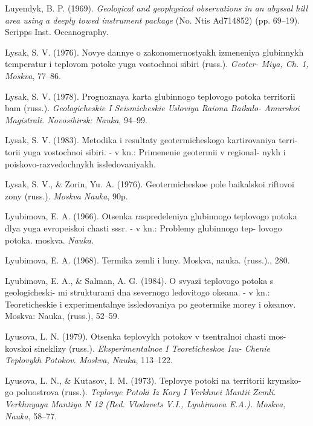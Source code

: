 \documentclass[draft,linenumbers]{agujournal2018}
\begin{document}
\leavevmode{}%
Luyendyk, B. P. (1969). \emph{Geological and geophysical observations in
an abyssal hill area using a deeply towed instrument package} (No. Ntis
Ad714852) (pp. 69--19). Scripps Inst. Oceanography.

\leavevmode{}%
Lysak, S. V. (1976). Novye dannye o zakonomernostyakh izmeneniya
glubinnykh temperatur i teplovom potoke yuga vostochnoi sibiri (russ.).
\emph{Geoter- Miya, Ch. 1, Moskva}, 77--86.

\leavevmode{}%
Lysak, S. V. (1978). Prognoznaya karta glubinnogo teplovogo potoka
territorii bam (russ.). \emph{Geologicheskie I Seismicheskie Usloviya
Raiona Baikalo- Amurskoi Magistrali. Novosibirsk: Nauka}, 94--99.

\leavevmode{}%
Lysak, S. V. (1983). Metodika i resultaty geotermicheskogo kartirovaniya
terri- torii yuga vostochnoi sibiri. - v kn.: Primenenie geotermii v
regional- nykh i poiskovo-razvedochnykh issledovaniyakh.

\leavevmode{}%
Lysak, S. V., \& Zorin, Yu. A. (1976). Geotermicheskoe pole baikalskoi
riftovoi zony (russ.). \emph{Moskva Nauka}, 90p.

\leavevmode{}%
Lyubimova, E. A. (1966). Otsenka raspredeleniya glubinnogo teplovogo
potoka dlya yuga evropeiskoi chasti sssr. - v kn.: Problemy glubinnogo
tep- lovogo potoka. moskva. \emph{Nauka.}

\leavevmode{}%
Lyubimova, E. A. (1968). Termika zemli i luny. Moskva, nauka. (russ.).,
280.

\leavevmode{}%
Lyubimova, E. A., \& Salman, A. G. (1984). O svyazi teplovogo potoka s
geologicheski- mi strukturami dna severnogo ledovitogo okeana. - v kn.:
Teoreticheskie i experimentalnye issledovaniya po geotermike morey i
okeanov. Moskva: Nauka, (russ.), 52--59.

\leavevmode{}%
Lyusova, L. N. (1979). Otsenka teplovykh potokov v tsentralnoi chasti
mos- kovskoi sineklizy (russ.). \emph{Eksperimentalnoe I Teoreticheskoe
Izu- Chenie Teplovykh Potokov. Moskva, Nauka}, 113--122.

\leavevmode{}%
Lyusova, L. N., \& Kutasov, I. M. (1973). Teplovye potoki na territorii
krymsko- go poluostrova (russ.). \emph{Teplovye Potoki Iz Kory I
Verkhnei Mantii Zemli. Verkhnyaya Mantiya N 12 (Red. Vlodavets V.I.,
Lyubimova E.A.). Moskva, Nauka}, 58--77.
\end{document}
